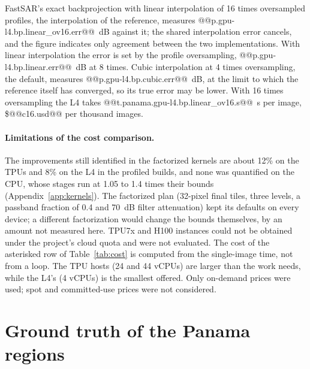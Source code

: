 \documentclass[11pt]{article}
\begin{document}
FastSAR's exact backprojection with linear interpolation of 16 times oversampled profiles, the interpolation of the reference, measures @@p.gpu-l4.bp.linear_ov16.err@@~dB against it; the shared interpolation error cancels, and the figure indicates only agreement between the two implementations. With linear interpolation the error is set by the profile oversampling, @@p.gpu-l4.bp.linear.err@@~dB at 8 times. Cubic interpolation at 4 times oversampling, the default, measures @@p.gpu-l4.bp.cubic.err@@~dB, at the limit to which the reference itself has converged, so its true error may be lower. With 16 times oversampling the L4 takes @@t.panama.gpu-l4.bp.linear_ov16.s@@~s per image, \$@@c16.usd@@ per thousand images.

\paragraph{Limitations of the cost comparison.} The improvements still identified in the factorized kernels are about 12\% on the TPUs and 8\% on the L4 in the profiled builds, and none was quantified on the CPU, whose stages run at 1.05 to 1.4 times their bounds (Appendix~\ref{app:kernels}). The factorized plan (32-pixel final tiles, three levels, a passband fraction of 0.4 and 70~dB filter attenuation) kept its defaults on every device; a different factorization would change the bounds themselves, by an amount not measured here. TPU7x and H100 instances could not be obtained under the project's cloud quota and were not evaluated. The cost of the asterisked row of Table~\ref{tab:cost} is computed from the single-image time, not from a loop. The TPU hosts (24 and 44 vCPUs) are larger than the work needs, while the L4's (4 vCPUs) is the smallest offered. Only on-demand prices were used; spot and committed-use prices were not considered.

\section{Ground truth of the Panama regions}
\label{app:truth}
\end{document}

